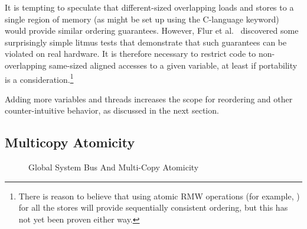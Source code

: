 \QuickQuizEnd

It is tempting to speculate that different-sized overlapping loads
and stores to a single region of memory (as might be set up using
the C-language  keyword) would provide similar ordering
guarantees.
However, Flur et al.~\cite{Flur:2017:MCA:3093333.3009839} discovered some
surprisingly simple litmus tests that demonstrate that such guarantees
can be violated on real hardware.
It is therefore necessary to restrict code to non-overlapping
same-sized aligned accesses to a given variable, at least if portability
is a consideration.\footnote{
	There is reason to believe that using atomic RMW operations
	(for example, ) for all the stores will
	provide sequentially consistent ordering, but this has not
	yet been proven either way.}

Adding more variables and threads increases the scope for reordering
and other counter-intuitive behavior, as discussed in the next section.

\subsection{Multicopy Atomicity}
\label{sec:memorder:Multicopy Atomicity}

\begin{figure}
\centering
{}
\caption{Global System Bus And Multi-Copy Atomicity}
\label{fig:memorder:Global System Bus And Multi-Copy Atomicity}
\end{figure}

